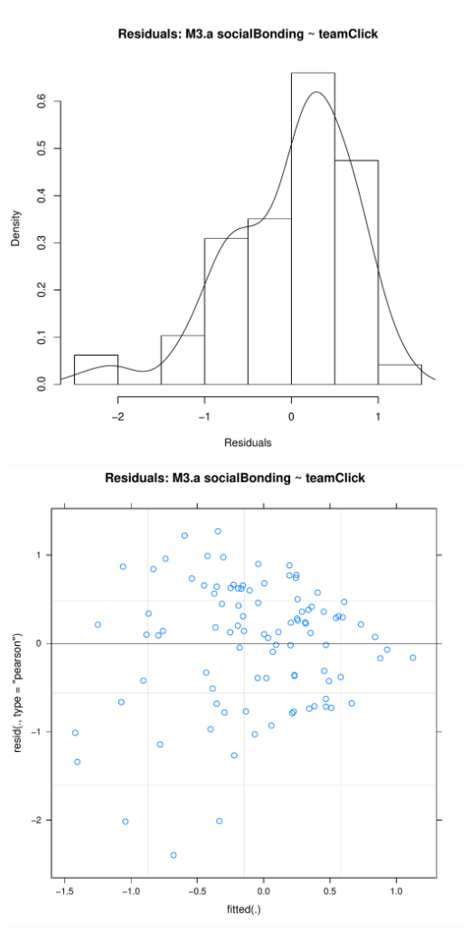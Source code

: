 \documentclass[12pt]{report}
\begin{document}


\centering
\newpage
\includegraphics[scale =.4]{../images/MLM3aHist.pdf}
\includegraphics[scale =.4]{../images/MLM3aScatter.pdf}
\end{document}
